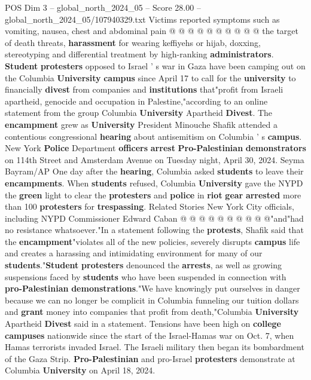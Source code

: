 \begin{textsample}{POS Dim 3 – global\_north\_2024\_05 – Score 28.00 – global\_north\_2024\_05/107940329.txt}
Victims reported symptoms such as vomiting, nausea, chest and abdominal pain @ @ @ @ @ @ @ @ @ @ the target of death threats, \textbf{harassment} for wearing keffiyehs or hijab, doxxing, stereotyping and differential treatment by high-ranking \textbf{administrators}. \textbf{Student} \textbf{protesters} opposed to Israel ' s war in Gaza have been camping out on the Columbia \textbf{University} \textbf{campus} since April 17 to call for the \textbf{university} to financially \textbf{divest} from companies and \textbf{institutions} that"profit from Israeli apartheid, genocide and occupation in Palestine,"according to an online statement from the group Columbia \textbf{University} Apartheid \textbf{Divest}.
The \textbf{encampment} grew as \textbf{University} President Minouche Shafik attended a contentious congressional \textbf{hearing} about antisemitism on Columbia ' s \textbf{campus}.
New York \textbf{Police} Department \textbf{officers} \textbf{arrest} \textbf{Pro-Palestinian} \textbf{demonstrators} on 114th Street and Amsterdam Avenue on Tuesday night, April 30, 2024.
Seyma Bayram/AP One day after the \textbf{hearing}, Columbia asked \textbf{students} to leave their \textbf{encampments}.
When \textbf{students} refused, Columbia \textbf{University} gave the NYPD the \textbf{green} light to clear the \textbf{protesters} and \textbf{police} in \textbf{riot} \textbf{gear} \textbf{arrested} more than 100 \textbf{protesters} for \textbf{trespassing}.
Related Stories New York City officials, including NYPD Commissioner Edward Caban @ @ @ @ @ @ @ @ @ @"and"had no resistance whatsoever."In a statement following the \textbf{protests}, Shafik said that the \textbf{encampment}"violates all of the new policies, severely disrupts \textbf{campus} life and creates a harassing and intimidating environment for many of our \textbf{students}."\textbf{Student} \textbf{protesters} denounced the \textbf{arrests}, as well as growing suspensions faced by \textbf{students} who have been suspended in connection with \textbf{pro-Palestinian} \textbf{demonstrations}."We have knowingly put ourselves in danger because we can no longer be complicit in Columbia funneling our tuition dollars and \textbf{grant} money into companies that profit from death,"Columbia \textbf{University} Apartheid \textbf{Divest} said in a statement.
Tensions have been high on \textbf{college} \textbf{campuses} nationwide since the start of the Israel-Hamas war on Oct. 7, when Hamas terrorists invaded Israel.
The Israeli military then began its bombardment of the Gaza Strip. \textbf{Pro-Palestinian} and pro-Israel \textbf{protesters} demonstrate at Columbia \textbf{University} on April 18, 2024.

\end{textsample}
